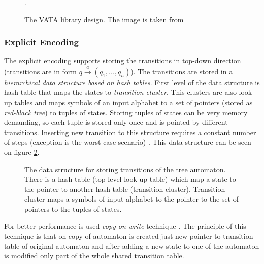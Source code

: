 \begin{figure}[bt]
\begin{center}

		\caption{The VATA library design. The image is taken from \cite{libvata}}.
		\label{picVataDesign}
\end{center}
\end{figure}

\subsubsection{Explicit Encoding}
\label{sectionExplicitEnc}
The explicit encoding supports storing the transitions in top-down direction (transitions are in form $q \xrightarrow{a} (q_1,...,q_n)$). The transitions
are stored in a \emph{hierarchical data structure based on hash tables}. First level of the data structure is hash table
that maps the states to \emph{transition cluster}. This clusters are also look-up tables and maps symbols of an input alphabet
to a set of pointers (stored as \emph{red-black tree}) to tuples of states. Storing tuples of states can be very memory demanding, so each tuple is stored
only once and is pointed by different transitions. 
Inserting new transition to this structure requires a constant number of steps (exception is the worst case scenario)
\cite{libvata}. This data structure can be seen on figure \ref{figExplicitTreeDataStr}.

\begin{figure}[bt]
\begin{center}

    \caption{The data structure for storing transitions of the tree automaton. There is a hash table (top-level look-up table) 
      which map a state to the pointer to another hash table (transition cluster). Transition cluster
      maps a symbols of input alphabet to the pointer to the set of pointers to the tuples of states.}
		\label{figExplicitTreeDataStr}
\end{center}
\end{figure}


For better performance is used \emph{copy-on-write} technique \cite{libvata}. The principle of this technique is 
that on copy of automaton is created just new pointer to transition table of original automaton and after adding a new state to one of the automaton 
is modified only part of the whole shared transition table. 

